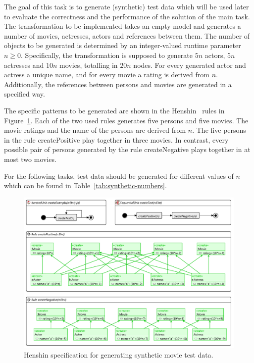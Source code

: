 \documentclass[a4paper,11pt]{article}
\begin{document}
The goal of this task is to generate (synthetic) test data which will be used
later to evaluate the correctness and the performance of the solution of the 
main task. The transformation to be implemented takes an empty model and 
generates a number of movies, actresses, actors and references between them.
The number of objects to be generated is determined by an integer-valued 
runtime parameter $n\geq0$. Specifically, the transformation is supposed
to generate $5n$ actors, $5n$ actresses and $10n$ movies, totalling in 
$20n$ nodes. For every generated actor and actress a unique name, and for 
every movie a rating is derived from $n$. Additionally, the references between
persons and movies are generated in a specified way.

The specific patterns to be generated are shown in the Henshin~\cite{ABJ+10} rules in
Figure~\ref{fig:gen-test-data}. Each of the two used rules generates five
persons and five movies. The movie ratings and the name of the persons are
derived from $n$. The five persons in the rule \textsf{createPositive} play
together in three movies. In contrast,
every possible pair of persons generated by the rule \textsf{createNegative}
plays together in at most two movies.

For the following tasks, test data should be generated for different values 
of $n$ which can be found in Table~\ref{tab:synthetic-numbers}.


\begin{figure}[p]
\centering
\includegraphics[scale=1.0,angle=90]{gen-test-data3}
\caption{Henshin specification for generating synthetic movie test data.}
\label{fig:gen-test-data}
\end{figure}
\end{document}
